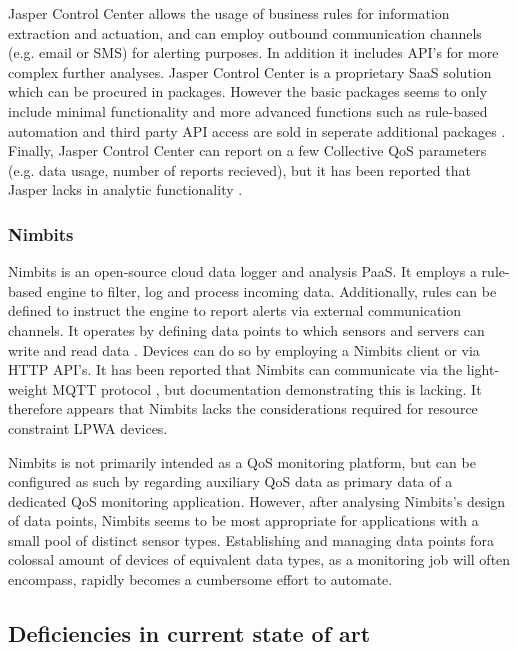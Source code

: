 Jasper Control Center allows the usage of business rules for information extraction and actuation, and can employ outbound communication channels (e.g. email or SMS) for alerting purposes.  In addition it includes API's for more complex further analyses. Jasper Control Center is a proprietary SaaS solution which can be procured in packages. However the basic packages seems to only include minimal functionality and more advanced functions such as rule-based automation and third party API access are sold in seperate additional packages \cite{cisco_jasper}. Finally, Jasper Control Center can report on a few Collective QoS parameters (e.g. data usage, number of reports recieved), but it has been reported that Jasper lacks in analytic functionality \cite{forrester}.

\subsubsection*{Nimbits \cite{website:nimbits}}
Nimbits is an open-source cloud data logger and analysis PaaS. It employs a rule-based engine to filter, log and process incoming data. Additionally, rules can be defined to instruct the engine to report alerts via external communication channels. It operates by defining data points to which sensors and servers can write and read data \cite{study_of_various, nimbits_mqtt}. Devices can do so by employing a Nimbits client or via HTTP API's. It has been reported that Nimbits can communicate via the light-weight MQTT protocol \cite{nimbits_mqtt}, but documentation demonstrating this is lacking. It therefore appears that Nimbits lacks the considerations required for resource constraint LPWA devices.

Nimbits is not primarily intended as a QoS monitoring platform, but can be configured as such by regarding auxiliary QoS data as primary data of a dedicated QoS monitoring application. However, after analysing Nimbits's design of data points, Nimbits seems to be most appropriate for applications with a small pool of distinct sensor types. Establishing and managing data points fora colossal amount of devices of equivalent data types, as a monitoring job will often encompass, rapidly becomes a cumbersome effort to automate.

\subsection{Deficiencies in current state of art}

